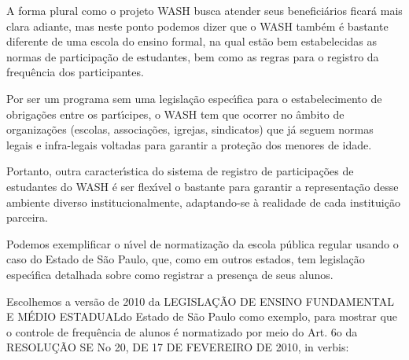 \documentclass[
12pt,		%
openright,	%
twoside,  %
a4paper,			%
chapter=TITLE,		%
english,			%
french,				%
spanish,			%
brazil				%
]{USPSC-classe/USPSC_RedarTex}
\begin{document}
A forma plural como o projeto WASH busca atender seus benefici\'arios ficar\'a mais clara adiante, mas neste ponto podemos dizer que o WASH tamb\'em \'e bastante diferente de uma escola do ensino formal, na qual est\~ao bem estabelecidas as normas de participa\c{c}\~ao de estudantes, bem como as regras para o registro da frequ\^encia dos participantes.










Por ser um programa sem uma legisla\c{c}\~ao espec\'{\i}fica para o estabelecimento de obriga\c{c}\~oes entre os part\'{\i}cipes, o WASH tem que ocorrer no \^ambito de organiza\c{c}\~oes (escolas, associa\c{c}\~oes, igrejas, sindicatos) que j\'a seguem normas legais e infra-legais voltadas para garantir a prote\c{c}\~ao dos menores de idade.










Portanto, outra caracter\'{\i}stica do sistema de registro de participa\c{c}\~oes de estudantes do WASH \'e ser flex\'{\i}vel o bastante para garantir a representa\c{c}\~ao desse ambiente diverso institucionalmente, adaptando-se \`a realidade de cada institui\c{c}\~ao parceira.










Podemos exemplificar o n\'{\i}vel de normatiza\c{c}\~ao da escola p\'ublica regular usando o caso do Estado de S\~ao Paulo, que, como em outros estados, tem legisla\c{c}\~ao espec\'{\i}fica detalhada sobre como registrar a presen\c{c}a de seus alunos.










Escolhemos a vers\~ao de 2010 da \textquotedbl LEGISLA\c{C}\~AO DE ENSINO FUNDAMENTAL E M\'EDIO ESTADUAL\textquotedbl  do Estado de S\~ao Paulo como exemplo, para mostrar que o controle de frequ\^encia de alunos \'e normatizado por meio do Art. 6o da RESOLU\c{C}\~AO SE No 20, DE 17 DE FEVEREIRO DE 2010, in verbis:
\end{document}
